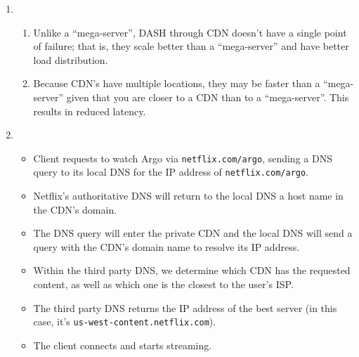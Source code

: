 \documentclass{report}
\begin{document}
\begin{problem}
\begin{answer}{40em}
\begin{enumerate}[label=(\alph*)]
  \item
    \begin{enumerate}[label=\textit{(\roman*)}]
    \item Unlike a ``mega-server'', DASH through CDN doesn't have a single point of failure; that
      is, they scale better than a ``mega-server'' and have better load distribution.
    \item Because CDN's have multiple locations, they may be faster than a ``mega-server'' given
      that you are closer to a CDN than to a ``mega-server''. This results in reduced latency.
    \end{enumerate}
  \item
    \begin{itemize}
    \item Client requests to watch Argo via \texttt{netflix.com/argo}, sending a DNS query to its
      local DNS for the IP address of \texttt{netflix.com/argo}.
    \item Netflix's authoritative DNS will return to the local DNS a host name in the CDN's domain.
    \item The DNS query will enter the private CDN and the local DNS will send a query with the
      CDN's domain name to resolve its IP address.
    \item Within the third party DNS, we determine which CDN has the requested content, as well as
      which one is the closest to the user's ISP. 
    \item The third party DNS returns the IP address of the best server (in this case, it's
      \texttt{us-west-content.netflix.com}).
    \item The client connects and starts streaming.
    \end{itemize}
\end{enumerate}

\end{answer}
\end{problem}
\end{document}
